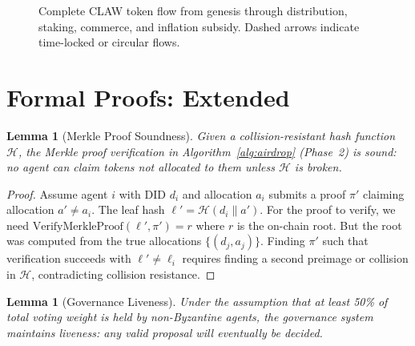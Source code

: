 \documentclass[conference]{IEEEtran}
\newtheorem{lemma}[theorem]{Lemma}
\begin{document}
\begin{figure}[h]
{}%
\caption{Complete CLAW token flow from genesis through distribution, staking, commerce, and inflation subsidy. Dashed arrows indicate time-locked or circular flows.}
\label{fig:tokenflow}
\end{figure}

\section{Formal Proofs: Extended}\label{app:proofs}

\begin{lemma}[Merkle Proof Soundness]
Given a collision-resistant hash function $\mathcal{H}$, the Merkle proof verification in Algorithm~\ref{alg:airdrop} (Phase~2) is sound: no agent can claim tokens not allocated to them unless $\mathcal{H}$ is broken.
\end{lemma}

\begin{proof}
Assume agent $i$ with DID $d_i$ and allocation $a_i$ submits a proof $\pi'$ claiming allocation $a' \neq a_i$. The leaf hash $\ell' = \mathcal{H}(d_i \| a')$. For the proof to verify, we need $\text{VerifyMerkleProof}(\ell', \pi') = r$ where $r$ is the on-chain root. But the root was computed from the true allocations $\{(d_j, a_j)\}$. Finding $\pi'$ such that verification succeeds with $\ell' \neq \ell_i$ requires finding a second preimage or collision in $\mathcal{H}$, contradicting collision resistance.
\end{proof}

\begin{lemma}[Governance Liveness]
Under the assumption that at least 50\% of total voting weight is held by non-Byzantine agents, the governance system maintains liveness: any valid proposal will eventually be decided.
\end{lemma}
\end{document}
